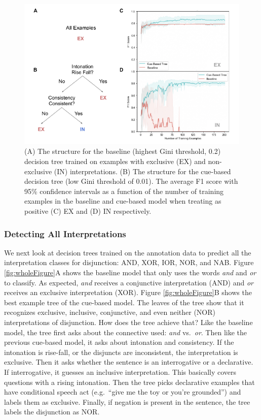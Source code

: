 \documentclass[
  english,
  ,man,floatsintext]{apa6}
\begin{document}
\begin{figure}
\centering
\includegraphics{figs/binaryFigure-1.pdf}
\caption{\label{fig:binaryFigure}(A) The structure for the baseline (highest Gini threshold, 0.2) decision tree trained on examples with exclusive (EX) and non-exclusive (IN) interpretations. (B) The structure for the cue-based decision tree (low Gini threshold of 0.01). The average F1 score with 95\% confidence intervals as a function of the number of training examples in the baseline and cue-based model when treating as positive (C) EX and (D) IN respectively.}
\end{figure}

\hypertarget{detecting-all-interpretations}{%
\subsubsection{Detecting All Interpretations}\label{detecting-all-interpretations}}

We next look at decision trees trained on the annotation data to predict all the interpretation classes for disjunction: AND, XOR, IOR, NOR, and NAB. Figure \ref{fig:wholeFigure}A shows the baseline model that only uses the words \emph{and} and \emph{or} to classify. As expected, \emph{and} receives a conjunctive interpretation (AND) and \emph{or} receives an exclusive interpretation (XOR). Figure \ref{fig:wholeFigure}B shows the best example tree of the cue-based model. The leaves of the tree show that it recognizes exclusive, inclusive, conjunctive, and even neither (NOR) interpretations of disjunction. How does the tree achieve that? Like the baseline model, the tree first asks about the connective used: \emph{and} vs.~\emph{or}. Then like the previous cue-based model, it asks about intonation and consistency. If the intonation is rise-fall, or the disjuncts are inconsistent, the interpretation is exclusive. Then it asks whether the sentence is an interrogative or a declarative. If interrogative, it guesses an inclusive interpretation. This basically covers questions with a rising intonation. Then the tree picks declarative examples that have conditional speech act (e.g.~``give me the toy or you're grounded'') and labels them as exclusive. Finally, if negation is present in the sentence, the tree labels the disjunction as NOR.
\end{document}
